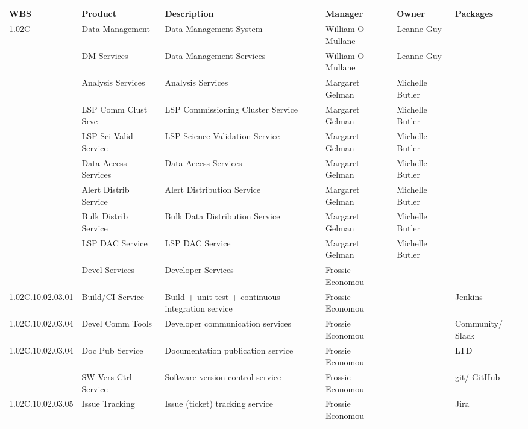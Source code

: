 

\tiny
\begin{longtable}{|p{}|p{}|p{}|p{}|p{}|p{}|}\hline
\textbf{WBS} & Product & Description & Manager & Owner & Packages\\ \hline
1.02C &  Data Management & Data Management System & William O Mullane & Leanne Guy & \\ \hline
 &  DM Services & Data Management Services & William O Mullane & Leanne Guy & \\ \hline
 &  Analysis Services & Analysis Services & Margaret Gelman & Michelle Butler & \\ \hline
 &  LSP Comm Clust Srvc & LSP Commissioning Cluster Service & Margaret Gelman & Michelle Butler & \\ \hline
 &  LSP Sci Valid Service & LSP Science Validation Service & Margaret Gelman & Michelle Butler & \\ \hline
 &  Data Access Services & Data Access Services & Margaret Gelman & Michelle Butler & \\ \hline
 &  Alert Distrib Service & Alert Distribution Service & Margaret Gelman & Michelle Butler & \\ \hline
 &  Bulk Distrib Service & Bulk Data Distribution Service & Margaret Gelman & Michelle Butler & \\ \hline
 &  LSP DAC Service & LSP DAC Service & Margaret Gelman & Michelle Butler & \\ \hline
 &  Devel Services & Developer Services & Frossie Economou &  & \\ \hline
1.02C.10.02.03.01 &  Build/CI Service & Build + unit test + continuous integration service & Frossie Economou &  & Jenkins\\ \hline
1.02C.10.02.03.04 &  Devel Comm Tools & Developer communication services & Frossie Economou &  & Community/ Slack\\ \hline
1.02C.10.02.03.04 &  Doc Pub Service & Documentation publication service & Frossie Economou &  & LTD\\ \hline
 &  SW Vers Ctrl Service & Software version control service & Frossie Economou &  & git/ GitHub\\ \hline
1.02C.10.02.03.05 &  Issue Tracking & Issue (ticket) tracking service & Frossie Economou &  & Jira\\ \hline

\end{longtable}
